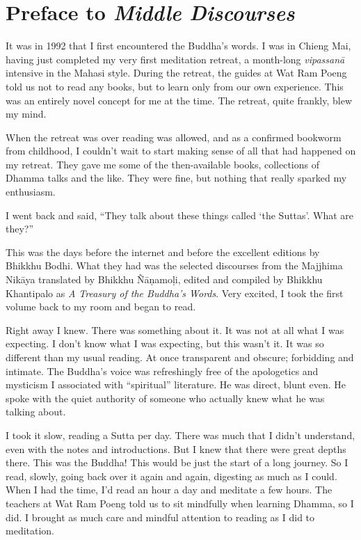 \documentclass[12pt,openany]{book}%
\begin{document}
%
\chapter*{Preface to \emph{Middle Discourses}}

It was in 1992 that I first encountered the Buddha’s words. I was in Chieng Mai, having just completed my very first meditation retreat, a month-long \emph{\textsanskrit{vipassanā}} intensive in the Mahasi style. During the retreat, the guides at Wat Ram Poeng told us not to read any books, but to learn only from our own experience. This was an entirely novel concept for me at the time. The retreat, quite frankly, blew my mind.

When the retreat was over reading was allowed, and as a confirmed  bookworm from childhood, I couldn’t wait to start making sense of all that had happened on my retreat. They gave me some of the then-available books, collections of Dhamma talks and the like. They were fine, but nothing that really sparked my enthusiasm. 

I went back and said, “They talk about these things called ‘the Suttas’. What are they?”

This was the days before the internet and before the excellent editions by Bhikkhu Bodhi. What they had was the selected discourses from the Majjhima \textsanskrit{Nikāya} translated by Bhikkhu \textsanskrit{Ñāṇamoḷi}, edited and compiled by Bhikkhu Khantipalo as \textit{A Treasury of the Buddha’s Words}. Very excited, I took the first volume back to my room and began to read.

Right away I knew. There was something about it. It was not at all what I was expecting. I don’t know what I was expecting, but this wasn’t it. It was so different than my usual reading. At once transparent and obscure; forbidding and intimate. The Buddha’s voice was refreshingly free of the apologetics and mysticism I associated with “spiritual” literature. He was direct, blunt even. He spoke with the quiet authority of someone who actually knew what he was talking about.

I took it slow, reading a Sutta per day. There was much that I didn’t understand, even with the notes and introductions. But I knew that there were great depths there. This was the Buddha! This would be just the start of a long journey. So I read, slowly, going back over it again and again, digesting as much as I could. When I had the time, I’d read an hour a day and meditate a few hours. The teachers at Wat Ram Poeng told us to sit mindfully when learning Dhamma, so I did. I brought as much care and mindful attention to reading as I did to meditation.
\end{document}

